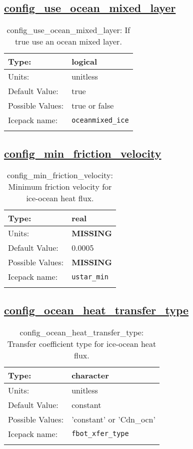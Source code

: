 \subsection[config\_use\_ocean\_mixed\_layer]{\hyperref[sec:nm_tab_ocean]{config\_use\_ocean\_mixed\_layer}}
\label{subsec:nm_sec_config_use_ocean_mixed_layer}
\begin{center}
\begin{longtable}{| p{2.0in} || p{4.0in} |}
    \hline
    Type: & logical \\
    \hline
    Units: & \si{unitless} \\
    \hline
    Default Value: & true \\
    \hline
    Possible Values: & true or false \\
    \hline
    \hline
    Icepack name: & \verb+oceanmixed_ice+ \\
    \caption{config\_use\_ocean\_mixed\_layer: If true use an ocean mixed layer.}
\end{longtable}
\end{center}
\subsection[config\_min\_friction\_velocity]{\hyperref[sec:nm_tab_ocean]{config\_min\_friction\_velocity}}
\label{subsec:nm_sec_config_min_friction_velocity}
\begin{center}
\begin{longtable}{| p{2.0in} || p{4.0in} |}
    \hline
    Type: & real \\
    \hline
    Units: & {\bf \color{red} MISSING} \\
    \hline
    Default Value: & 0.0005 \\
    \hline
    Possible Values: & {\bf \color{red} MISSING} \\
    \hline
    \hline
    Icepack name: & \verb+ustar_min+ \\
    \caption{config\_min\_friction\_velocity: Minimum friction velocity for ice-ocean heat flux.}
\end{longtable}
\end{center}
\subsection[config\_ocean\_heat\_transfer\_type]{\hyperref[sec:nm_tab_ocean]{config\_ocean\_heat\_transfer\_type}}
\label{subsec:nm_sec_config_ocean_heat_transfer_type}
\begin{center}
\begin{longtable}{| p{2.0in} || p{4.0in} |}
    \hline
    Type: & character \\
    \hline
    Units: & \si{unitless} \\
    \hline
    Default Value: & constant \\
    \hline
    Possible Values: & 'constant' or 'Cdn\_ocn' \\
    \hline
    \hline
    Icepack name: & \verb+fbot_xfer_type+ \\
    \caption{config\_ocean\_heat\_transfer\_type: Transfer coefficient type for ice-ocean heat flux.}
\end{longtable}
\end{center}
